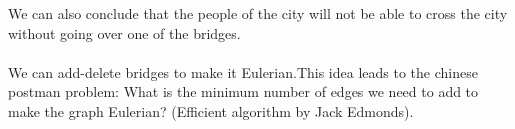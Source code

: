 \documentclass[10pt]{report}
\numberwithin{dummy}{section}
\theoremstyle{ocrenumbox}
\theoremstyle{grayman}
\begin{document}
\begin{minipage}{0.5\textwidth}
\begin{center}
\end{center}
\end{minipage}
We can also conclude that the people of the city will not be able to cross the city without going over one of the bridges.\\ \\
We can add-delete bridges to make it Eulerian.This idea leads to the chinese postman problem: What is the minimum number of edges we need to add to make the graph Eulerian? (Efficient algorithm by Jack Edmonds). 
\end{document}
